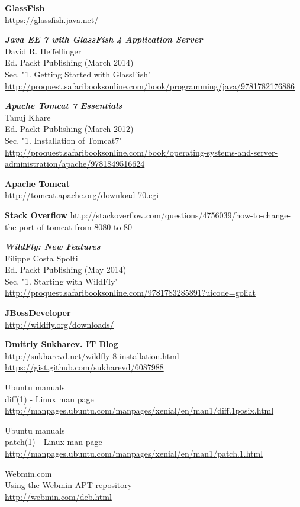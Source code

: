 \begin{thebibliography}{10}
\textbf{GlassFish}\\
  \url{https://glassfish.java.net/}

\textbf{\textit{Java EE 7 with GlassFish 4 Application Server}}\\
David R. Heffelfinger\\
Ed. Packt Publishing (March 2014)\\
Sec. "1. Getting Started with GlassFish"\\
  \url{http://proquest.safaribooksonline.com/book/programming/java/9781782176886}

\textbf{\textit{Apache Tomcat 7 Essentials}}\\
Tanuj Khare\\
Ed. Packt Publishing (March 2012)\\
Sec. "1. Installation of Tomcat7"\\
  \url{http://proquest.safaribooksonline.com/book/operating-systems-and-server-administration/apache/9781849516624}

\textbf{Apache Tomcat}\\
  \url{http://tomcat.apache.org/download-70.cgi}

\textbf{Stack Overflow}
  \url{http://stackoverflow.com/questions/4756039/how-to-change-the-port-of-tomcat-from-8080-to-80}

\textbf{\textit{WildFly: New Features}}\\
Filippe Costa Spolti\\
Ed. Packt Publishing (May 2014)\\
Sec. "1. Starting with WildFly"\\
  \url{http://proquest.safaribooksonline.com/9781783285891?uicode=goliat} 

\textbf{JBossDeveloper}\\
  \url{http://wildfly.org/downloads/}

\textbf{Dmitriy Sukharev. IT Blog}\\
  \url{http://sukharevd.net/wildfly-8-installation.html}
  \url{https://gist.github.com/sukharevd/6087988}

Ubuntu manuals\\
diff(1) - Linux man page\\
  \url{http://manpages.ubuntu.com/manpages/xenial/en/man1/diff.1posix.html}

Ubuntu manuals\\
patch(1) - Linux man page\\
  \url{http://manpages.ubuntu.com/manpages/xenial/en/man1/patch.1.html}

Webmin.com\\
Using the Webmin APT repository\\
  \url{http://webmin.com/deb.html}

\end{thebibliography}
